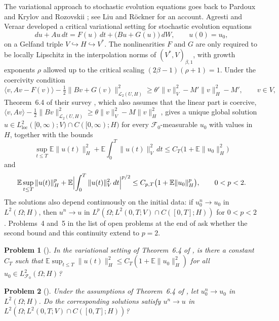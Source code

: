 \documentclass[11pt]{amsart}
\newtheorem{problem}{Problem}
\theoremstyle{remark}
\newcommand{\E}{\mathbb E}
\newcommand{\HS}{\mathcal L_2}
\begin{document}
The variational approach to stochastic evolution equations goes back to Pardoux \cite{Par75} and Krylov and Rozovskii \cite{KR79}; see Liu and R\"ockner \cite{LR15} for an account. Agresti and Veraar \cite{AV24} developed a critical variational setting for stochastic evolution equations
\begin{equation}\label{eq:abstract}
 du+Au\,dt=F(u)\,dt+\bigl(Bu+G(u)\bigr)\,dW,\qquad u(0)=u_0,
\end{equation}
on a Gelfand triple $V\hookrightarrow H\hookrightarrow V^*$. The nonlinearities $F$ and $G$ are only required to be locally Lipschitz in the interpolation norms of $(V^*,V)_{\beta,1}$, with growth exponents $\rho$ allowed up to the critical scaling $(2\beta-1)(\rho+1)=1$. Under the coercivity condition
\begin{equation}\label{eq:coerc}
 \langle v,Av-F(v)\rangle-\tfrac12\|Bv+G(v)\|_{\HS(U,H)}^2\ge\theta'\|v\|_V^2-M'\|v\|_H^2-M',\qquad v\in V,
\end{equation}
Theorem~6.4 of their survey \cite{AV25}, which also assumes that the linear part is coercive, $\langle v,Av\rangle-\frac12\|Bv\|_{\HS(U,H)}^2\ge\theta\|v\|_V^2-M\|v\|_H^2$ \cite[Assumption~6.1(1)]{AV25}, gives a unique global solution $u\in L^2_{\mathrm{loc}}([0,\infty);V)\cap C([0,\infty);H)$ for every $\mathcal F_0$-measurable $u_0$ with values in $H$, together with the bounds
\[
 \sup_{t\le T}\E\|u(t)\|_H^2+\E\int_0^T\|u(t)\|_V^2\,dt\le C_T\bigl(1+\E\|u_0\|_H^2\bigr)
\]
and
\[
 \E\sup_{t\le T}\|u(t)\|_H^p+\E\Bigl|\int_0^T\|u(t)\|_V^2\,dt\Bigr|^{p/2}\le C_{p,T}\bigl(1+\E\|u_0\|_H^p\bigr),\qquad 0<p<2.
\]
The solutions also depend continuously on the initial data: if $u_0^n\to u_0$ in $L^2(\Omega;H)$, then $u^n\to u$ in $L^p(\Omega;L^2(0,T;V)\cap C([0,T];H))$ for $0<p<2$ \cite[Theorem~3.8]{AV24}. Problems~4 and~5 in the list of open problems at the end of \cite{AV25} ask whether the second bound and this continuity extend to $p=2$.

\setcounter{problem}{3}
\begin{problem}[{\cite{AV25}}]
In the variational setting of Theorem~6.4 of \cite{AV25}, is there a constant $C_T$ such that $\E\sup_{t\le T}\|u(t)\|_H^2\le C_T(1+\E\|u_0\|_H^2)$ for all $u_0\in L^2_{\mathcal F_0}(\Omega;H)$?
\end{problem}

\begin{problem}[{\cite{AV25}}]
Under the assumptions of Theorem~6.4 of \cite{AV25}, let $u_0^n\to u_0$ in $L^2(\Omega;H)$. Do the corresponding solutions satisfy $u^n\to u$ in $L^2(\Omega;L^2(0,T;V)\cap C([0,T];H))$?
\end{problem}
\end{document}
